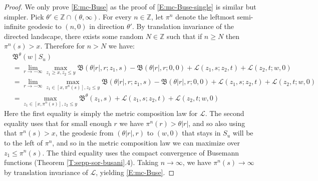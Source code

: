\documentclass[11pt]{article}
\newcommand{\Z}{\mathbb{Z}}
\newcommand{\cL}{\mathcal{L}}
\newcommand{\fB}{\mathfrak{B}}
\theoremstyle{definition} %
\theoremstyle{remark} %
\begin{document}
\begin{proof}
	We only prove \eqref{E:mc-Buse} as the proof of \eqref{E:mc-Buse-single} is similar but simpler.    
    Pick $\theta' \in \Z \cap (\theta, \infty)$.
		For every $n \in \Z$, let $\pi^n$ denote the leftmost semi-infinite geodesic to $(n, 0)$ in direction $\theta'$. By translation invariance of the directed landscape, there exists some random $N \in \Z$ such that if $n \ge N$ then $\pi^n(s) > x$. Therefore for $n > N$ we have:
		\begin{align*}
&\fB^\theta(w \mid S_u) \\&= \lim_{r \to -\infty} \max_{z_1 \ge x, z_2 \le y} \fB(\theta|r|, r; z_1, s) - \fB(\theta|r|, r; 0,0) + \cL(z_1, s; z_2, t) + \cL(z_2, t; w, 0) \\
&= \lim_{r \to -\infty} \max_{z_1 \in [x, \pi^n(s)], z_2 \le y} \fB(\theta|r|, r; z_1, s) - \fB(\theta|r|, r; 0,0) + \cL(z_1, s; z_2, t) + \cL(z_2, t; w, 0) \\
 &= \max_{z_1 \in [x, \pi^n(s)], z_2 \le y} \fB^\theta(z_1, s) + \cL(z_1, s; z_2, t) + \cL(z_2, t; w, 0)
\end{align*}
Here the first equality is simply the metric composition law for $\cL$. The second equality uses that for small enough $r$ we have $\pi^n(r) > \theta|r|$, and so also using that $\pi^n(s) > x$, the geodesic from $(\theta|r|, r)$ to $(w, 0)$ that stays in $S_u$ will be to the left of $\pi^n$, and so in the metric composition law we can maximize over $z_1 \le \pi^n(s)$. The third equality uses the compact convergence of Busemann functions (Theorem \ref{T:sepp-sor-busani}.4).  Taking $n \to \infty$, we have $\pi^n(s) \to \infty$ by translation invariance of $\cL$, yielding \eqref{E:mc-Buse}.
\end{proof}
\end{document}
